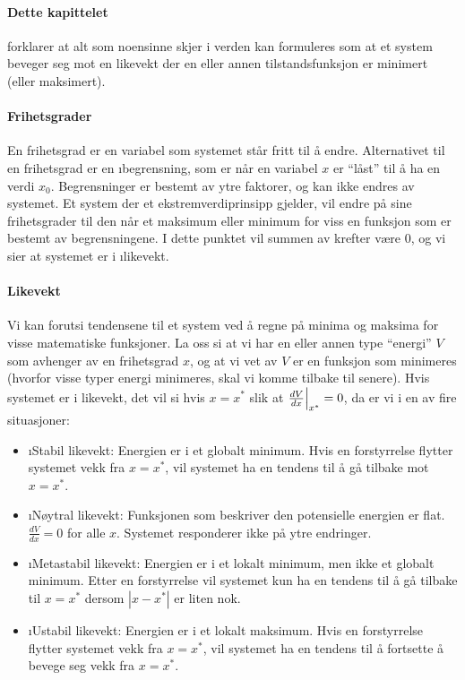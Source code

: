 \paragraph{Dette kapittelet} forklarer at alt som noensinne skjer i verden kan formuleres som at et system beveger seg mot en likevekt der en eller annen tilstandsfunksjon er minimert (eller maksimert).

\paragraph{Frihetsgrader}
En frihetsgrad er en variabel som systemet står fritt til å endre. Alternativet til en frihetsgrad er en \i{begrensning}, som er når en variabel $x$ er ``låst'' til å ha en verdi $x_0$. Begrensninger er bestemt av ytre faktorer, og kan ikke endres av systemet. Et system der et ekstremverdiprinsipp gjelder, vil endre på sine frihetsgrader til den når et maksimum eller minimum for viss en funksjon som er bestemt av begrensningene. I dette punktet vil summen av krefter være 0, og vi sier at systemet er i \i{likevekt}.

\paragraph{Likevekt}
Vi kan forutsi tendensene til et system ved å regne på minima og maksima for visse matematiske funksjoner. La oss si at vi har en eller annen type ``energi'' $V$ som avhenger av en frihetsgrad $x$, og at vi vet av $V$ er en funksjon som minimeres (hvorfor visse typer energi minimeres, skal vi komme tilbake til senere). Hvis systemet er i likevekt, det vil si hvis $x=x^*$ slik at $\frac{dV}{dx}\Bigr|_{x^*}=0$, da er vi i en av fire situasjoner:
\begin{itemize}
	\item \i{Stabil likevekt}: Energien er i et globalt minimum. Hvis en forstyrrelse flytter systemet vekk fra $x=x^*$, vil systemet ha en tendens til å gå tilbake mot $x=x^*$.
	\item \i{Nøytral likevekt}: Funksjonen som beskriver den potensielle energien er flat. $\frac{dV}{dx}=0$ for alle $x$. Systemet responderer ikke på ytre endringer.
	\item \i{Metastabil likevekt}: Energien er i et lokalt minimum, men ikke et globalt minimum. Etter en forstyrrelse vil systemet kun ha en tendens til å gå tilbake til $x=x^*$ dersom $|x-x^*|$ er liten nok.
	\item \i{Ustabil likevekt}: Energien er i et lokalt maksimum. Hvis en forstyrrelse flytter systemet vekk fra $x=x^*$, vil systemet ha en tendens til å fortsette å bevege seg vekk fra $x=x^*$.
\end{itemize}

